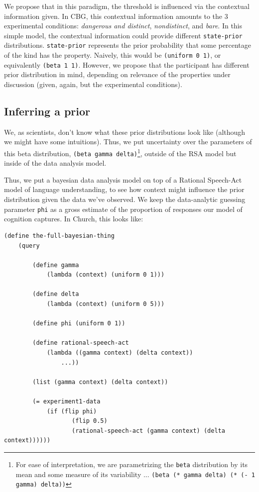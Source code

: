 \documentclass[10pt,letterpaper]{article}
\begin{document}
We propose that in this paradigm, the threshold is influenced via the contextual information given. In CBG, this contextual information amounts to the 3 experimental conditions: \emph{dangerous and distinct}, \emph{nondistinct}, and \emph{bare}. In this simple model, the contextual information could provide different \lstinline{state-prior} distributions. \lstinline{state-prior} represents the  prior probability that some percentage of the kind has the property. Naively, this would be \lstinline{(uniform 0 1)}, or equivalently \lstinline{(beta 1 1)}. However, we propose that the participant has different prior distribution in mind, depending on relevance of the properties under discussion (given, again, but the experimental conditions).

\subsection{Inferring a prior}
We, as scientists, don't know what these prior distributions look like (although we might have some intuitions). Thus, we put uncertainty over the parameters of this beta distribution, \lstinline{(beta gamma delta)}\footnote{For ease of interpretation, we are parametrizing the \lstinline{beta} distribution by its mean and some measure of its variability ... \lstinline{(beta (* gamma delta) (* (- 1 gamma) delta))}}, outside of the RSA model but inside of the data analysis model. 

Thus, we put a bayesian data analysis model on top of a Rational Speech-Act model of language understanding, to see how context might influence the prior distribution given the data we've observed. We keep the data-analytic guessing parameter \lstinline{phi} as a gross estimate of the proportion of responses our model of cognition captures. In Church, this looks like:

\begin{lstlisting}
(define the-full-bayesian-thing
	(query
	
		(define gamma
			(lambda (context) (uniform 0 1)))
			
		(define delta
			(lambda (context) (uniform 0 5)))
			
		(define phi (uniform 0 1))
	
		(define rational-speech-act
			(lambda ((gamma context) (delta context)) 
				...))
				
		(list (gamma context) (delta context))
				
		(= experiment1-data 
			(if (flip phi)
				   (flip 0.5)
				   (rational-speech-act (gamma context) (delta context))))))
\end{lstlisting}
\end{document}
